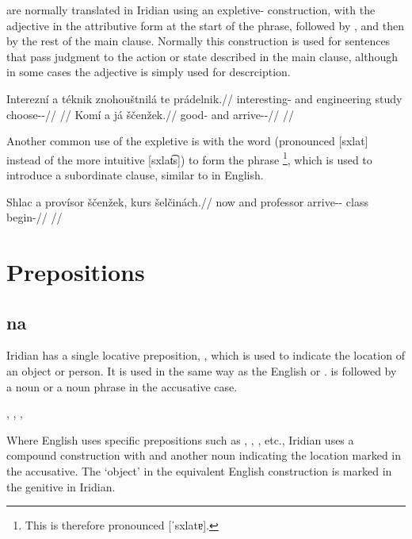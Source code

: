 are normally translated in Iridian using an expletive- construction, with the adjective in the attributive form at the start of the phrase, followed by , and then by the rest of the main clause. Normally this construction is used for sentences that pass judgment to the action or state described in the main clause, although in some cases the adjective is simply used for descrciption.

\pex
\begingl
    \gla Interezní a téknik znohouštnilá te prádelnik.//
    \glb interesting-\Att{} and engineering study  choose-\Pv{}-\Pf{}//
    \glft {}//
\endgl
\xe
\pex
\begingl
    \gla Komí a já ščenžek.//
    \glb good-\Att{} and \Second{}\Sg{} arrive-\Av{}-\Pf{}//
    \glft {}//
\endgl
\xe

Another common use of the expletive  is with the word  (pronounced [sxlat] instead of the more intuitive [sxlat͡s]) to form the phrase \footnote{This is therefore pronounced [ˈsxlatɐ].}, which is used to introduce a subordinate clause, similar to  in English.

\pex
\begingl
    \gla Shlac a provísor ščenžek, kurs šelčinách.//
    \glb now and professor arrive-\Av{}-\Pf{} class begin-//
    \glft {}//
\endgl
\xe


\section{Prepositions}

\subsection{na}

Iridian has a single locative preposition, , which is used to indicate the location of an object or person. It is used in the same way as the English  or .  is followed by a noun or a noun phrase in the accusative case.

\pex
\a {}, 
\a {}, 
\a {}, 
\xe

Where English uses specific prepositions such as , , , etc., Iridian uses a compound construction with  and another noun indicating the location marked in the accusative. The `object' in the equivalent English construction is marked in the genitive in Iridian.

